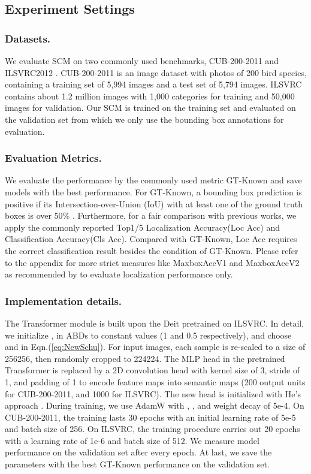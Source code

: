 \documentclass[runningheads]{llncs}
\begin{document}
\subsection{Experiment Settings}
\subsubsection{Datasets.} We evaluate SCM on two commonly used benchmarks, CUB-200-2011 \cite{WelinderEtal2010} and ILSVRC2012 \cite{ILSVRC15}. CUB-200-2011 is an image dataset with photos of 200 bird species, containing a training set of 5,994 images and a test set of 5,794 images. ILSVRC contains about 1.2 million images with 1,000 categories for training and 50,000 images for validation. Our SCM is trained on the training set and evaluated on the validation set from which we only use the bounding box annotations for evaluation. 

\subsubsection{Evaluation Metrics.}
We evaluate the performance by the commonly used metric GT-Known and save models with the best performance. 
For GT-Known, a bounding box prediction is positive if its Intersection-over-Union (IoU)  with at least one of the ground truth boxes is over 50\% . 
Furthermore, for a fair comparison with previous works, we apply the commonly reported Top1/5 Localization Accuracy(Loc Acc) and Classification Accuracy(Cls Acc). 
Compared with GT-Known, Loc Acc requires the correct classification result besides the condition of GT-Known.
Please refer to the appendix for more strict measures like MaxboxAccV1 and MaxboxAccV2 as recommended by \cite{choe2020evaluating} to evaluate localization performance only.


\subsubsection{Implementation details.} The Transformer module is built upon the Deit \cite{touvron2021training} pretrained on ILSVRC. In detail, we initialize ,  in ABDs to constant values (1 and 0.5 respectively), and choose  and  in Eqn.(\ref{eq:NewSchu}). For input images, each sample is re-scaled to a size of 256256, then randomly cropped to 224224. The MLP head in the pretrained Transformer is replaced by a 2D convolution head with kernel size of 3, stride of 1, and padding of 1 to encode feature maps into semantic maps  (200 output units for CUB-200-2011, and 1000 for ILSVRC). The new head is initialized with He's approach \cite{DBLP:journals/corr/HeZR015}. During training, we use AdamW \cite{DBLP:journals/corr/abs-1711-05101} with , ,  and weight decay of 5e-4. On CUB-200-2011, the training lasts 30 epochs with an initial learning rate of 5e-5 and batch size of 256. On ILSVRC, the training procedure carries out 20 epochs with a learning rate of 1e-6 and batch size of 512. 
We measure model performance on the validation set after every epoch. At last, we save the parameters with the best GT-Known performance on the validation set.
\end{document}
